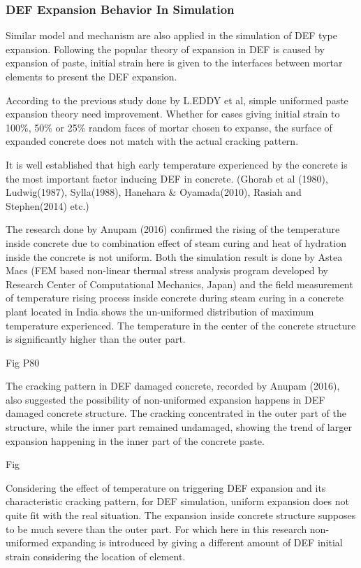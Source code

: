 \subsubsection{DEF Expansion Behavior In Simulation}

Similar model and mechanism are also applied in the simulation of DEF  type expansion. Following the popular theory of expansion in DEF  is caused by expansion of paste, initial strain here is given to the interfaces between mortar elements to present the DEF expansion.

According to the previous study done by L.EDDY et al, simple uniformed paste expansion theory need improvement. Whether for cases giving initial strain to 100\%, 50\% or 25\% random faces of mortar chosen to expanse, the surface of expanded concrete does not match with the actual cracking pattern.

It is well established that high early temperature experienced by the concrete is the most important factor inducing DEF in concrete. (Ghorab et al (1980), Ludwig(1987), Sylla(1988), Hanehara \& Oyamada(2010), Rasiah and Stephen(2014) etc.)

The research done by Anupam (2016) confirmed the rising of the temperature inside concrete due to combination effect of steam curing and heat of hydration inside the concrete is not uniform. Both the simulation result is done by Astea Macs (FEM based non-linear thermal stress analysis program developed by Research Center of Computational Mechanics, Japan) and the field measurement of temperature rising process inside concrete during steam curing in a concrete plant located in India shows the un-uniformed distribution of maximum temperature experienced. The temperature in the center of the concrete structure is significantly higher than the outer part.

Fig P80

The cracking pattern in DEF damaged concrete, recorded by Anupam (2016), also suggested the possibility of non-uniformed expansion happens in DEF damaged concrete structure. The cracking concentrated in the outer part of the structure, while the inner part remained undamaged, showing the trend of larger expansion happening in the inner part of the concrete paste.

Fig

Considering the effect of temperature on triggering  DEF expansion and its characteristic cracking pattern, for DEF simulation, uniform expansion does not quite fit with the real situation. The expansion inside concrete structure supposes to be much severe than the outer part. For which here in this research non-uniformed expanding is introduced by giving a different amount of DEF initial strain considering the location of element.


